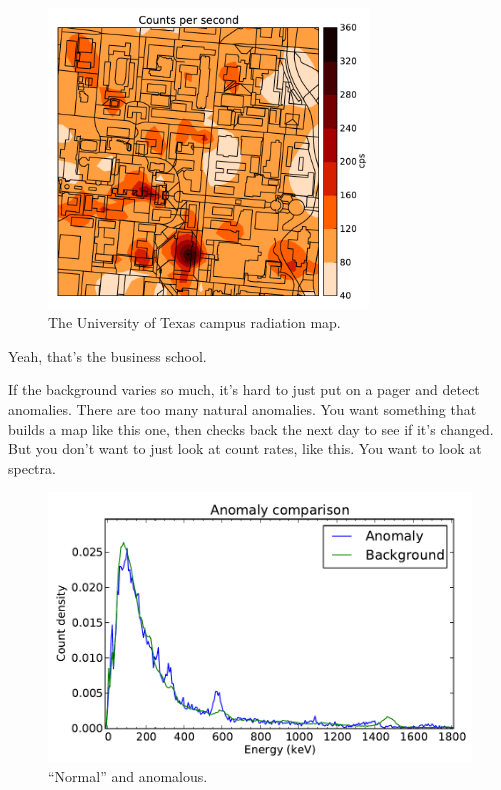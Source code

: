 \documentclass[ignorenonframetext]{beamer}
\begin{document}
\begin{frame}
  \begin{figure}
    \includegraphics[width=85mm]{figures/talk-campus-map.pdf}
    \caption{The University of Texas campus radiation map.}
  \end{figure}
\end{frame}

Yeah, that's the business school.

If the background varies so much, it's hard to just put on a pager and detect
anomalies. There are too many natural anomalies. You want something that builds
a map like this one, then checks back the next day to see if it's changed. But
you don't want to just look at count rates, like this. You want to look at
spectra.

\begin{frame}
  \begin{figure}
    \includegraphics[width=120mm]{figures/talk-spectral-anomaly.pdf}
    \caption{``Normal'' and anomalous.}
  \end{figure}
\end{frame}
\end{document}
